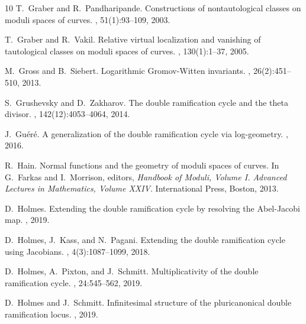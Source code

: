 \documentclass[a4paper,12pt]{article} %
\theoremstyle{definition}
\theoremstyle{plain}%
\begin{document}
\begin{thebibliography}{10}
T.~Graber and R.~Pandharipande.
\newblock Constructions of nontautological classes on moduli spaces of curves.
, 51(1):93--109, 2003.

T.~Graber and R.~Vakil.
\newblock Relative virtual localization and vanishing of tautological classes
  on moduli spaces of curves.
, 130(1):1--37, 2005.

M.~Gross and B.~Siebert.
\newblock Logarithmic {G}romov-{W}itten invariants.
, 26(2):451--510, 2013.

S.~Grushevsky and D.~Zakharov.
\newblock The double ramification cycle and the theta divisor.
, 142(12):4053--4064, 2014.

J.~Gu{\'e}r{\'e}.
\newblock A generalization of the double ramification cycle via log-geometry.
,
  2016.

R.~Hain.
\newblock Normal functions and the geometry of moduli spaces of curves.
\newblock In G.~Farkas and I.~Morrison, editors, {\em Handbook of Moduli,
  Volume I. Advanced Lectures in Mathematics, Volume XXIV}. International
  Press, Boston, 2013.

D.~Holmes.
\newblock Extending the double ramification cycle by resolving the
  {Abel-Jacobi} map.
, 2019.

D.~Holmes, J.~Kass, and N.~Pagani.
\newblock Extending the double ramification cycle using Jacobians.
, 4(3):1087--1099, 2018.

D.~Holmes, A.~Pixton, and J.~Schmitt.
\newblock Multiplicativity of the double ramification cycle.
, 24:545--562, 2019.

D.~Holmes and J.~Schmitt.
\newblock Infinitesimal structure of the pluricanonical double ramification
  locus.
,
  2019.


\end{thebibliography}
\end{document}
